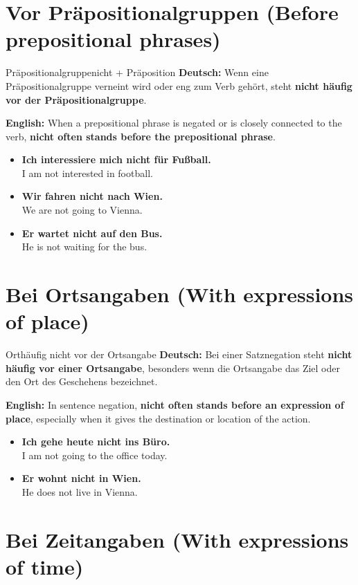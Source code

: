 \documentclass[a4paper,11pt]{article}
\newcommand{\GermanText}[1]{\textbf{Deutsch: }#1\par}
\newcommand{\EnglishText}[1]{{\small\color{SoftGray}\textbf{English: }#1\par}}
\newcommand{\ExampleItem}[2]{\item \textbf{#1}\\{\small\color{SoftGray}#2}}
\begin{document}
\section{Vor Präpositionalgruppen \textnormal{(Before prepositional phrases)}}

\begin{grammarentry}{Präpositionalgruppe}{nicht + Präposition}
\GermanText{Wenn eine Präpositionalgruppe verneint wird oder eng zum Verb gehört, steht \textbf{nicht häufig vor der Präpositionalgruppe}.}
\EnglishText{When a prepositional phrase is negated or is closely connected to the verb, \textbf{nicht often stands before the prepositional phrase}.}
\end{grammarentry}

\begin{exbox}
\begin{itemize}
\ExampleItem{Ich interessiere mich \textbf{nicht für Fußball}.}{I am not interested in football.}
\ExampleItem{Wir fahren \textbf{nicht nach Wien}.}{We are not going to Vienna.}
\ExampleItem{Er wartet \textbf{nicht auf den Bus}.}{He is not waiting for the bus.}
\end{itemize}
\end{exbox}

\section{Bei Ortsangaben \textnormal{(With expressions of place)}}

\begin{grammarentry}{Ort}{häufig nicht vor der Ortsangabe}
\GermanText{Bei einer Satznegation steht \textbf{nicht häufig vor einer Ortsangabe}, besonders wenn die Ortsangabe das Ziel oder den Ort des Geschehens bezeichnet.}
\EnglishText{In sentence negation, \textbf{nicht often stands before an expression of place}, especially when it gives the destination or location of the action.}
\end{grammarentry}

\begin{exbox}
\begin{itemize}
\ExampleItem{Ich gehe heute \textbf{nicht ins Büro}.}{I am not going to the office today.}
\ExampleItem{Er wohnt \textbf{nicht in Wien}.}{He does not live in Vienna.}
\end{itemize}
\end{exbox}

\section{Bei Zeitangaben \textnormal{(With expressions of time)}}
\end{document}
